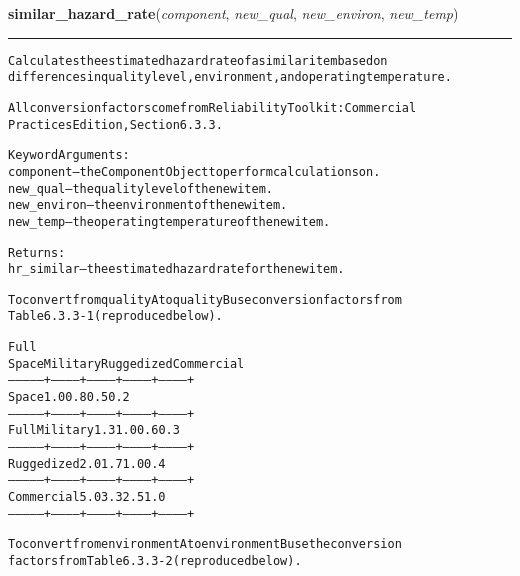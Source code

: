 \hspace{.8\funcindent}\begin{boxedminipage}{\funcwidth}

    \raggedright \textbf{similar\_hazard\_rate}(\textit{component}, \textit{new\_qual}, \textit{new\_environ}, \textit{new\_temp})

    \vspace{-1.5ex}

    \rule{\textwidth}{0.5\fboxrule}
\setlength{\parskip}{2ex}
\begin{alltt}
Calculates the estimated hazard rate of a similar item based on
differences in quality level, environment, and operating temperature.

All conversion factors come from Reliability Toolkit: Commercial
Practices Edition, Section 6.3.3.

Keyword Arguments:
  component -- the Component Object to perform calculations on.
   new\_qual -- the quality level of the new item.
new\_environ -- the environment of the new item.
   new\_temp -- the operating temperature of the new item.

Returns:
 hr\_similar -- the estimated hazard rate for the new item.

To convert from quality A to quality B use conversion factors from
Table 6.3.3-1 (reproduced below).

              {\textbar}           {\textbar}    Full   {\textbar}           {\textbar}           {\textbar}
              {\textbar}   Space   {\textbar}  Military {\textbar} Ruggedized{\textbar} Commercial{\textbar}
--------------+-----------+-----------+-----------+-----------+
Space         {\textbar}    1.0    {\textbar}    0.8    {\textbar}    0.5    {\textbar}    0.2    {\textbar}
--------------+-----------+-----------+-----------+-----------+
Full Military {\textbar}    1.3    {\textbar}    1.0    {\textbar}    0.6    {\textbar}    0.3    {\textbar}
--------------+-----------+-----------+-----------+-----------+
Ruggedized    {\textbar}    2.0    {\textbar}    1.7    {\textbar}    1.0    {\textbar}    0.4    {\textbar}
--------------+-----------+-----------+-----------+-----------+
Commercial    {\textbar}    5.0    {\textbar}    3.3    {\textbar}    2.5    {\textbar}    1.0    {\textbar}
--------------+-----------+-----------+-----------+-----------+

To convert from environment A to environment B use the conversion
factors from Table 6.3.3-2 (reproduced below).


\end{alltt}
\end{boxedminipage}
